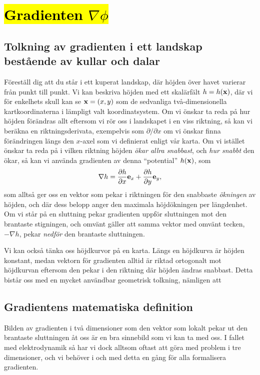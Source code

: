 \section{{\hl{Gradienten $\nabla\phi$}}}
\subsection{Tolkning av gradienten i ett landskap best{\aa}ende av
  kullar och dalar}
F{\"o}rest{\"a}ll dig att du st{\aa}r i ett kuperat landskap, d{\"a}r
h{\"o}jden {\"o}ver havet varierar fr{\aa}n punkt till punkt.
Vi kan beskriva h{\"o}jden med ett skal{\"a}rf{\"a}lt $h=h({\bf x})$,
d{\"a}r vi f{\"o}r enkelhets skull kan se ${\bf x}=(x,y)$ som de sedvanliga
tv{\aa}-dimensionella kartkoordinaterna i l{\"a}mpligt valt koordinatsystem.
\noindent
Om vi {\"o}nskar ta reda p{\aa} hur h{\"o}jden f{\"o}r{\"a}ndras allt eftersom
vi r{\"o}r oss i landskapet i en viss riktning, s{\aa} kan vi ber{\"a}kna en
riktningsderivata, exempelvis som $\partial/\partial x$ om vi {\"o}nskar finna
f{\"o}r{\"a}ndringen l{\"a}ngs den $x$-axel som vi definierat enligt v{\aa}r
karta.
Om vi ist{\"a}llet {\"o}nskar ta reda p{\aa} i vilken riktning h{\"o}jden
{\it {\"o}kar allra snabbast}, och {\it hur snabbt} den {\"o}kar, s{\aa}
kan vi anv{\"a}nda gradienten av denna ``potential'' $h({\bf x})$, som
$$
  \nabla h={{\partial h}\over{\partial x}}{\bf e}_x
    +{{\partial h}\over{\partial y}}{\bf e}_y,
$$
som allts{\aa} ger oss en vektor som pekar i riktningen f{\"o}r den snabbaste
{\it {\"o}kningen} av h{\"o}jden, och d{\"a}r dess belopp anger den maximala
h{\"o}jd{\"o}kningen per l{\"a}ngdenhet.
Om vi st{\aa}r p{\aa} en sluttning pekar gradienten uppf{\"o}r sluttningen
mot den brantaste stigningen, och omv{\"a}nt g{\"a}ller att samma vektor med
omv{\"a}nt tecken, $-\nabla h$, pekar {\it nedf{\"o}r} den brantaste
sluttningen.

Vi kan ocks{\aa} t{\"a}nka oss h{\"o}jdkurvor p{\aa} en karta. L{\"a}ngs en
h{\"o}jdkurva {\"a}r h{\"o}jden konstant, medan vektorn f{\"o}r gradienten
alltid {\"a}r riktad ortogonalt mot h{\"o}jdkurvan eftersom den pekar i den
riktning d{\"a}r h{\"o}jden {\"a}ndras snabbast.
Detta bist{\aa}r oss med en mycket anv{\"a}ndbar geometrisk tolkning,
n{\"a}mligen att

\subsection{Gradientens matematiska definition}
Bilden av gradienten i tv{\aa} dimensioner som den vektor som lokalt pekar ut
den brantaste sluttningen {\aa}t oss {\"a}r en bra sinnebild som vi kan ta med
oss. I fallet med elektrodynamik s{\aa} har vi dock alltsom oftast att g{\"o}ra
med problem i tre dimensioner, och vi beh{\"o}ver i och med detta en g{\aa}ng
f{\"o}r alla formalisera gradienten.

